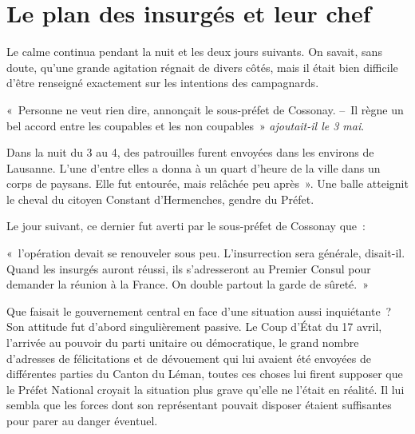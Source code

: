 \documentclass[french,twoside]{book} %
\newenvironment{quoteblock}%
  {\begin{quoting}}
  {\end{quoting}}
\newenvironment{quotebar}{%
    \def\FrameCommand{{\color{rubric!10!}\vrule width 0.5em} \hspace{0.9em}}%
    \def\OuterFrameSep{\itemsep} %
    \MakeFramed {\advance\hsize-\width \FrameRestore}
  }%
  {%
    \endMakeFramed
  }
\renewenvironment{quoteblock}%
  {%
    \savenotes
    \setstretch{0.9}
    \normalfont
    \begin{quotebar}
  }
  {%
    \end{quotebar}
    \spewnotes
  }
\begin{document}
\section[{Le plan des insurgés et leur chef}]{Le plan des insurgés et leur chef}
\noindent Le calme continua pendant la nuit et les deux jours suivants. On savait, sans doute, qu’une grande agitation régnait de divers côtés, mais il était bien difficile d’être renseigné exactement sur les intentions des campagnards.\par

\begin{quoteblock}
\noindent « Personne ne veut rien dire, annonçait le sous-préfet de Cossonay. – Il règne un bel accord entre les coupables et les non coupables » \emph{ajoutait-il le 3 mai}.\end{quoteblock}

\noindent Dans la nuit du 3 au 4, des patrouilles furent envoyées dans les environs de Lausanne. L’une d’entre elles a donna à un quart d’heure de la ville dans un corps de paysans. Elle fut entourée, mais relâchée peu après ». Une balle atteignit le cheval du citoyen Constant d’Hermenches, gendre du Préfet.\par
Le jour suivant, ce dernier fut averti par le sous-préfet de Cossonay que :\par

\begin{quoteblock}
\noindent « l’opération devait se renouveler sous peu. L’insurrection sera générale, disait-il. Quand les insurgés auront réussi, ils s’adresseront au Premier Consul pour demander la réunion à la France. On double partout la garde de sûreté. »\end{quoteblock}

\noindent Que faisait le gouvernement central en face d’une situation aussi inquiétante ? Son attitude fut d’abord singulièrement passive. Le Coup d’État du 17 avril, l’arrivée au pouvoir du parti unitaire ou démocratique, le grand nombre d’adresses de félicitations et de dévouement qui lui avaient été envoyées de différentes parties du Canton du Léman, toutes ces choses lui firent supposer que le Préfet National croyait la situation plus grave qu’elle ne l’était en réalité. Il lui sembla que les forces dont son représentant pouvait disposer étaient suffisantes pour parer au danger éventuel.\par
\end{document}
